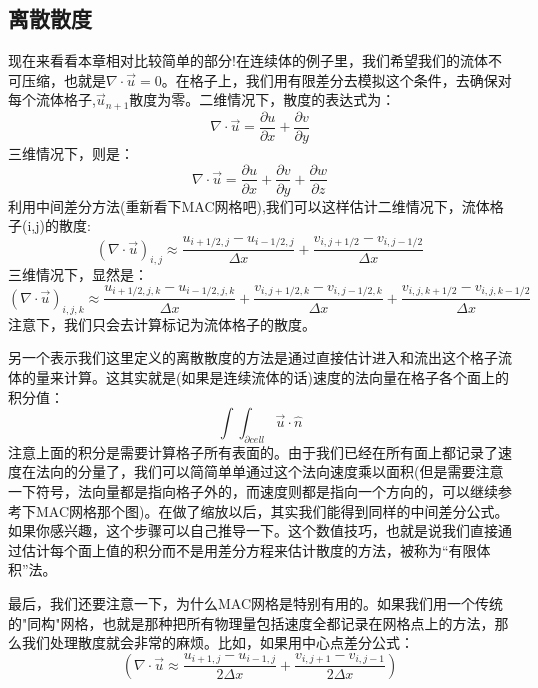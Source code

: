 \documentclass{article}
\begin{document}
\subsection{离散散度}
现在来看看本章相对比较简单的部分!在连续体的例子里，我们希望我们的流体不可压缩，也就是$\nabla\cdot\vec{u}=0$。在格子上，我们用有限差分去模拟这个条件，去确保对每个流体格子,${\vec{u}_{n+1}}$散度为零。二维情况下，散度的表达式为：
\begin{equation}
\nabla\cdot{\vec{u}}=\frac{\partial{u}}{\partial{x}}+\frac{\partial{v}}{\partial{y}}
\end{equation}
三维情况下，则是：
\begin{equation}
\nabla\cdot{\vec{u}}=\frac{\partial{u}}{\partial{x}}+\frac{\partial{v}}{\partial{y}}+\frac{\partial{w}}{\partial{z}}
\end{equation}
利用中间差分方法(重新看下MAC网格吧),我们可以这样估计二维情况下，流体格子(i,j)的散度:
\begin{equation}
(\nabla\cdot{\vec{u}})_{i,j}\approx{\frac{u_{i+1/2,j}-u_{i-1/2,j}}{\Delta{x}}+\frac{v_{i,j+1/2}-v_{i,j-1/2}}{\Delta{x}}}
\end{equation}
三维情况下，显然是：
\begin{equation}
(\nabla\cdot{\vec{u}})_{i,j,k}\approx{\frac{u_{i+1/2,j,k}-u_{i-1/2,j,k}}{\Delta{x}}+\frac{v_{i,j+1/2,k}-v_{i,j-1/2,k}}{\Delta{x}}+\frac{v_{i,j,k+1/2}-v_{i,j,k-1/2}}{\Delta{x}}}
\end{equation}
注意下，我们只会去计算标记为流体格子的散度。
\par
另一个表示我们这里定义的离散散度的方法是通过直接估计进入和流出这个格子流体的量来计算。这其实就是(如果是连续流体的话)速度的法向量在格子各个面上的积分值：
\begin{equation}
\int{\int_{\partial{cell}}}\vec{u}\cdot\hat{n}
\end{equation}
注意上面的积分是需要计算格子所有表面的。由于我们已经在所有面上都记录了速度在法向的分量了，我们可以简简单单通过这个法向速度乘以面积(但是需要注意一下符号，法向量都是指向格子外的，而速度则都是指向一个方向的，可以继续参考下MAC网格那个图)。在做了缩放以后，其实我们能得到同样的中间差分公式。如果你感兴趣，这个步骤可以自己推导一下。这个数值技巧，也就是说我们直接通过估计每个面上值的积分而不是用差分方程来估计散度的方法，被称为“有限体积”法。
\par
最后，我们还要注意一下，为什么MAC网格是特别有用的。如果我们用一个传统的"同构"网格，也就是那种把所有物理量包括速度全都记录在网格点上的方法，那么我们处理散度就会非常的麻烦。比如，如果用中心点差分公式：
\begin{equation}
(\nabla\cdot\vec{u}\approx \frac{u_{i+1,j}-u_{i-1,j}}{2\Delta{x}} + \frac{v_{i,j+1}-v_{i,j-1}}{2\Delta{x}})
\end{equation}
\end{document}
